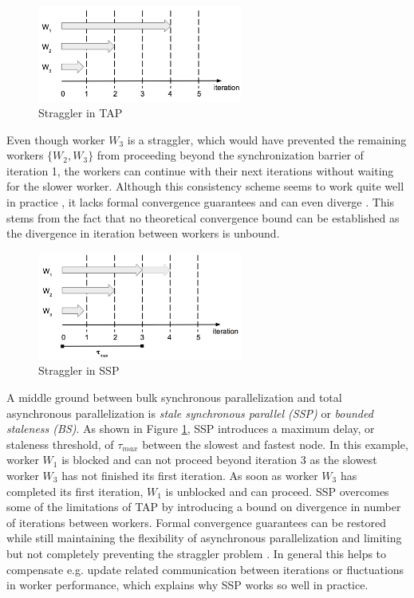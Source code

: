 \begin{figure}[h]
\centering
\includegraphics[width=0.6\textwidth]{img/tap_straggler.png}
\caption{Straggler in TAP}
\label{fig:tap_straggler}
\end{figure}
Even though worker $W_3$ is a straggler, which would have prevented the remaining workers $\{W_2, W_3\}$ from proceeding beyond the synchronization barrier of iteration 1, the workers can continue with their next iterations without waiting for the slower worker.
Although this consistency scheme seems to work quite well in practice \cite{li2014scaling}, it lacks formal convergence guarantees and can even diverge \cite{dai2014high}.
This stems from the fact that no theoretical convergence bound can be established as the divergence in iteration between workers is unbound.
\begin{figure}[h]
\centering
\includegraphics[width=0.6\textwidth]{img/ssp_straggler.png}
\caption{Straggler in SSP}
\label{fig:ssp_straggler}
\end{figure}
A middle ground between bulk synchronous parallelization and total asynchronous parallelization is \textit{stale synchronous parallel (SSP)} \cite{ho2013more} or \textit{bounded staleness (BS)}.
As shown in Figure \ref{fig:tap_straggler}, SSP introduces a maximum delay, or staleness threshold, of $\tau_{max}$ between the slowest and fastest node.
In this example, worker $W_1$ is blocked and can not proceed beyond iteration 3 as the slowest worker $W_3$ has not finished its first iteration.
As soon as worker $W_3$ has completed its first iteration, $W_1$ is unblocked and can proceed.
SSP overcomes some of the limitations of TAP by introducing a bound on divergence in number of iterations between workers.
Formal convergence guarantees can be restored while still maintaining the flexibility of asynchronous parallelization and limiting but not completely preventing the straggler problem \cite{cipar2013solving}.
In general this helps to compensate e.g. update related communication between iterations or fluctuations in worker performance, which explains why SSP works so well in practice.
